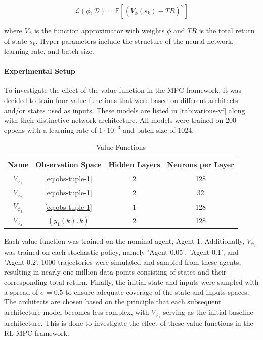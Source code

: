 \begin{equation}\label{eq:vf_tr_loss}
    \mathcal{L}(\phi, \mathcal{D}) =  \mathbb{E} [(V_{\phi}(s_k) - TR)^2]
\end{equation}

where $V_{\phi}$ is the function approximator with weights $\phi$ and $TR$ is the total return of state $s_k$. Hyper-parameters include the structure of the neural network, learning rate, and batch size.\\



\paragraph{Experimental Setup}
To investigate the effect of the value function in the MPC framework, it was decided to train four value functions that were based on different architects and/or states used as inputs. These models are listed in \autoref{tab:various-vf} along with their distinctive network architecture. All models were trained on 200 epochs with a learning rate of $1 \cdot 10^{-3}$ and batch size of $1024$.

\begin{table}[H]
	\centering
	\renewcommand{\arraystretch}{1.3}
	\setlength{\tabcolsep}{12pt}
	\begin{tabular}{cccc}
		\toprule
		\textbf{Name} & \textbf{Observation Space} & \textbf{Hidden Layers} & \textbf{Neurons per Layer} \\
		\midrule
		$V_{\phi_1}$ & \autoref{eq:obs-tuple-1} & 2 & 128 \\  
		$V_{\phi_2}$ & \autoref{eq:obs-tuple-1} & 2 & 32 \\  
		$V_{\phi_3}$ & \autoref{eq:obs-tuple-1} & 1 & 128 \\  
		$V_{\phi_4}$ & $(y_1(k), k)$ & 2 & 128 \\  
		\bottomrule
	\end{tabular}
	\caption{Value Functions}
	\label{tab:various-vf}
\end{table}

Each value function was trained on the nominal agent, Agent 1. Additionally, $V_{\phi_4}$ was trained on each stochastic policy, namely 'Agent 0.05', 'Agent 0.1', and 'Agent 0.2'. 1000 trajectories were simulated and sampled from these agents, resulting in nearly one million data points consisting of states and their corresponding total return. Finally, the initial state and inputs were sampled with a spread of $\sigma = 0.5$ to ensure adequate coverage of the state and inputs spaces. The architects are chosen based on the principle that each subsequent architecture model becomes less complex, with $V_{\phi_1}$ serving as the initial baseline architecture. This is done to investigate the effect of these value functions in the RL-MPC framework.

